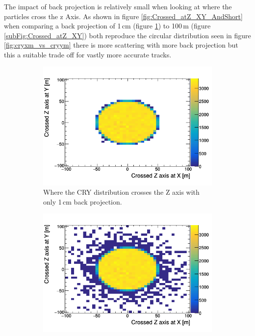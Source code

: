The impact of back projection is relatively small when looking at where the particles cross the z Axis. As shown in figure \ref{fig:Crossed_atZ_XY_AndShort} when comparing a back projection of 1\,cm (figure \ref{subFig:CrossedZAxisShort}) to 100\,m (figure \ref{subFig:Crossed_atZ_XY}) both reproduce the circular distribution seen in figure \ref{fig:cryxm_vs_cryym} there is more scattering with more back projection but this a suitable trade off for vastly more accurate tracks. 

\begin{figure}[htbp]
\centering
\begin{subfigure}{.5\textwidth}
  \centering
  \includegraphics[width=\linewidth]{Chapter4/Figs/Raster/CryPlots/CrossedZAxisShort.png}
  \captionsetup{width=.9\linewidth}
  \caption{Where the CRY distribution crosses the Z axis with only 1\,cm back projection.}
  \label{subFig:CrossedZAxisShort}
\end{subfigure}%
\begin{subfigure}{.5\textwidth}
  \centering
  \includegraphics[width=\linewidth]{Chapter4/Figs/Raster/CryPlots/Crossed_atZ_XY.png}

\end{subfigure}
\end{figure}
